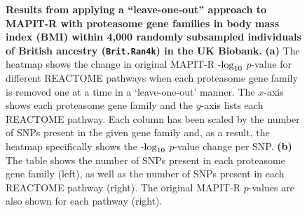 \documentclass[10pt]{article}
\def\log{{\rm log}}
\begin{document}
\begin{figure}[H]
\caption{\textbf{Results from applying a ``leave-one-out'' approach to MAPIT-R with proteasome gene families in body mass index (BMI) within 4,000 randomly subsampled individuals of British ancestry (\texttt{Brit.Ran4k}) in the UK Biobank.} \textbf{(a)} The heatmap shows the change in original MAPIT-R -$\log_{10}$ $p$-value for different REACTOME pathways when each proteasome gene family is removed one at a time in a `leave-one-out' manner. The $x$-axis shows each proteasome gene family and the $y$-axis lists each REACTOME pathway. Each column has been scaled by the number of SNPs present in the given gene family and, as a result, the heatmap specifically shows the -$\log_{10}$ $p$-value change per SNP. \textbf{(b)} The table shows the number of SNPs present in each proteasome gene family (left), as well as the number of SNPs present in each REACTOME pathway (right). The original MAPIT-R $p$-values are also shown for each pathway (right).}
\label{InterPath-Supp-Figure-Prot-Heatplots-BritRan4000}
\end{figure}
\clearpage
\end{document}
